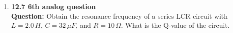 \documentclass{article}
\begin{document}
\begin{enumerate}


\item \textbf{ 12.7 6th analog question}\\
\textbf{Question:} 
Obtain the resonance frequency of a series LCR circuit with $L = 2.0\, H$, $C = 32\, \mu F$, and $R = 10\, \Omega$. What is the Q-value of the circuit.\\
\end{enumerate}
\end{document}
